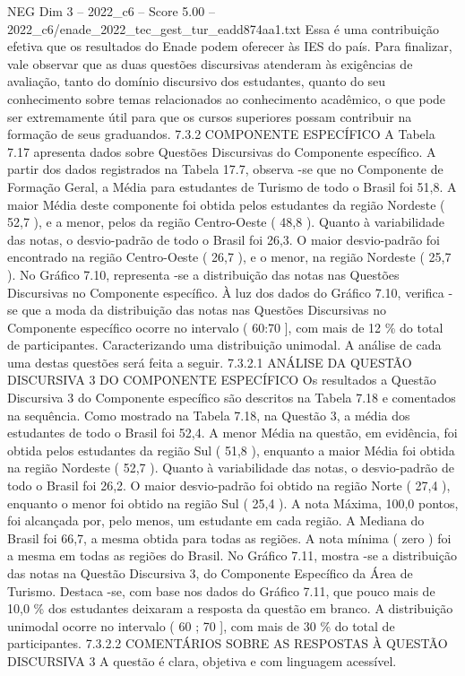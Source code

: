 \begin{textsample}{NEG Dim 3 – 2022\_c6 – Score 5.00 – 2022\_c6/enade\_2022\_tec\_gest\_tur\_eadd874aa1.txt}
Essa é uma contribuição efetiva que os resultados do Enade podem oferecer às IES do país.
Para finalizar, vale observar que as duas questões discursivas atenderam às exigências de avaliação, tanto do domínio discursivo dos estudantes, quanto do seu conhecimento sobre temas relacionados ao conhecimento acadêmico, o que pode ser extremamente útil para que os cursos superiores possam contribuir na formação de seus graduandos. 7.3.2 COMPONENTE ESPECÍFICO A Tabela 7.17 apresenta dados sobre Questões Discursivas do Componente específico.
A partir dos dados registrados na Tabela 17.7, observa -se que no Componente de Formação Geral, a Média para estudantes de Turismo de todo o Brasil foi 51,8.
A maior Média deste componente foi obtida pelos estudantes da região Nordeste ( 52,7 ), e a menor, pelos da região Centro-Oeste ( 48,8 ).
Quanto à variabilidade das notas, o desvio-padrão de todo o Brasil foi 26,3.
O maior desvio-padrão foi encontrado na região Centro-Oeste ( 26,7 ), e o menor, na região Nordeste ( 25,7 ).
No Gráfico 7.10, representa -se a distribuição das notas nas Questões Discursivas no Componente específico.
À luz dos dados do Gráfico 7.10, verifica -se que a moda da distribuição das notas nas Questões Discursivas no Componente específico ocorre no intervalo ( 60:70 ], com mais de 12 \% do total de participantes.
Caracterizando uma distribuição unimodal.
A análise de cada uma destas questões será feita a seguir. 7.3.2.1 ANÁLISE DA QUESTÃO DISCURSIVA 3 DO COMPONENTE ESPECÍFICO Os resultados a Questão Discursiva 3 do Componente específico são descritos na Tabela 7.18 e comentados na sequência.
Como mostrado na Tabela 7.18, na Questão 3, a média dos estudantes de todo o Brasil foi 52,4.
A menor Média na questão, em evidência, foi obtida pelos estudantes da região Sul ( 51,8 ), enquanto a maior Média foi obtida na região Nordeste ( 52,7 ).
Quanto à variabilidade das notas, o desvio-padrão de todo o Brasil foi 26,2.
O maior desvio-padrão foi obtido na região Norte ( 27,4 ), enquanto o menor foi obtido na região Sul ( 25,4 ).
A nota Máxima, 100,0 pontos, foi alcançada por, pelo menos, um estudante em cada região.
A Mediana do Brasil foi 66,7, a mesma obtida para todas as regiões.
A nota mínima ( zero ) foi a mesma em todas as regiões do Brasil.
No Gráfico 7.11, mostra -se a distribuição das notas na Questão Discursiva 3, do Componente Específico da Área de Turismo.
Destaca -se, com base nos dados do Gráfico 7.11, que pouco mais de 10,0 \% dos estudantes deixaram a resposta da questão em branco.
A distribuição unimodal ocorre no intervalo ( 60 ; 70 ], com mais de 30 \% do total de participantes. 7.3.2.2 COMENTÁRIOS SOBRE AS RESPOSTAS À QUESTÃO DISCURSIVA 3 A questão é clara, objetiva e com linguagem acessível.

\end{textsample}
